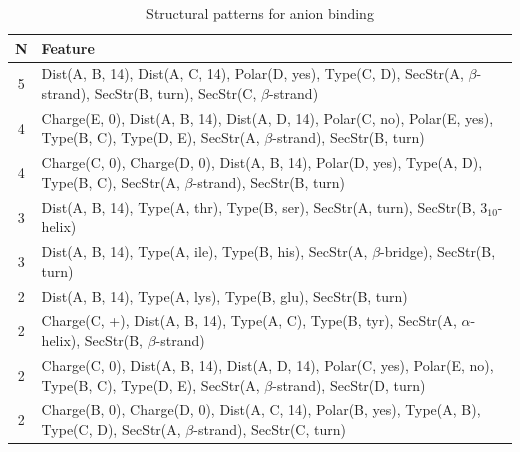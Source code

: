 \documentclass[11pt,twoside,a4paper]{book}
\begin{document}
\begin{table}\begin{tabularx}{\textwidth}{cX}\textbf{N} & \textbf{Feature} \\ \hline  
5 & Dist(A, B, 14), Dist(A, C, 14), Polar(D, yes),  Type(C, D), SecStr(A, $\beta$-strand), \newline SecStr(B, turn), SecStr(C, $\beta$-strand)\\ \hline 
4 & Charge(E, 0), Dist(A, B, 14), Dist(A, D, 14), Polar(C, no), Polar(E, yes),  \newline Type(B, C), Type(D, E), SecStr(A, $\beta$-strand), SecStr(B, turn)\\ \hline 
4 & Charge(C, 0), Charge(D, 0), Dist(A, B, 14), Polar(D, yes),  Type(A, D), Type(B, C), SecStr(A, $\beta$-strand), SecStr(B, turn)\\ \hline 
3 & Dist(A, B, 14),  Type(A, thr), Type(B, ser), SecStr(A, turn), SecStr(B, $3_{10}$-helix)\\ \hline 
3 & Dist(A, B, 14),  Type(A, ile), Type(B, his), SecStr(A, $\beta$-bridge), SecStr(B, turn)\\ \hline 
2 & Dist(A, B, 14),  Type(A, lys), Type(B, glu), SecStr(B, turn)\\ \hline 
2 & Charge(C, +), Dist(A, B, 14),  Type(A, C), Type(B, tyr), SecStr(A, $\alpha$-helix),  \newline SecStr(B, $\beta$-strand)\\ \hline 
2 & Charge(C, 0), Dist(A, B, 14), Dist(A, D, 14), Polar(C, yes), Polar(E, no),  \newline Type(B, C), Type(D, E), SecStr(A, $\beta$-strand), SecStr(D, turn)\\ \hline 
2 & Charge(B, 0), Charge(D, 0), Dist(A, C, 14), Polar(B, yes),  Type(A, B), Type(C, D), SecStr(A, $\beta$-strand), SecStr(C, turn)\\ \hline 
 \end{tabularx}\caption{Structural patterns for anion binding}\label{tab:anion_binding}\end{table}
\end{document}
